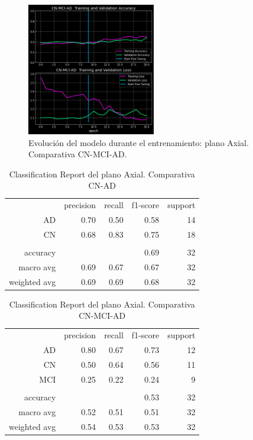 \begin{figure}[H]
    \centering
    \includegraphics[width=0.5\textwidth]{./imgs/resultados/axial/CN_MCI_AD_output_AXIAL}
    \caption{Evolución del modelo durante el entrenamiento: plano Axial. Comparativa CN-MCI-AD. }
    \label{fig:axial-c-mci-ad}
\end{figure}

\begin{table}[H]
    \centering
    \begin{tabular}{r r r r r}
        & precision & recall & f1-score & support \\
        AD & 0.70 & 0.50 & 0.58 & 14 \\
        CN & 0.68 & 0.83 & 0.75 & 18 \\
        & & & & \\
        accuracy &  &  & 0.69 & 32 \\
        macro avg & 0.69 & 0.67 & 0.67 & 32 \\
        weighted avg & 0.69 & 0.69 & 0.68 & 32 \\
    \end{tabular}
    \caption{Classification Report del plano Axial. Comparativa CN-AD}
    \label{tab:cr-axial-cn-ad}
\end{table}

\begin{table}[H]
    \centering
    \begin{tabular}{r r r r r}
        & precision & recall & f1-score & support \\
        AD & 0.80 & 0.67 & 0.73 & 12 \\
        CN & 0.50 & 0.64 & 0.56 & 11 \\
        MCI & 0.25 & 0.22 & 0.24 & 9 \\
        & & & & \\
        accuracy &  &  & 0.53 & 32 \\
        macro avg & 0.52 & 0.51 & 0.51 & 32 \\
        weighted avg & 0.54 & 0.53 & 0.53 & 32 \\
    \end{tabular}
    \caption{Classification Report del plano Axial. Comparativa CN-MCI-AD}
    \label{tab:cr-axial-cn-mci-ad}
\end{table}

